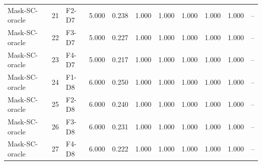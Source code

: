 \begin{table}[ht]
\begin{tabular}{lllrrrrrrrr}
Mask-SC-oracle & 21 & F2-D7 & 5.000 & 0.238 & 1.000 & 1.000 & 1.000 & 1.000 & 1.000 & -- \\
Mask-SC-oracle & 22 & F3-D7 & 5.000 & 0.227 & 1.000 & 1.000 & 1.000 & 1.000 & 1.000 & -- \\
Mask-SC-oracle & 23 & F4-D7 & 5.000 & 0.217 & 1.000 & 1.000 & 1.000 & 1.000 & 1.000 & -- \\
Mask-SC-oracle & 24 & F1-D8 & 6.000 & 0.250 & 1.000 & 1.000 & 1.000 & 1.000 & 1.000 & -- \\
Mask-SC-oracle & 25 & F2-D8 & 6.000 & 0.240 & 1.000 & 1.000 & 1.000 & 1.000 & 1.000 & -- \\
Mask-SC-oracle & 26 & F3-D8 & 6.000 & 0.231 & 1.000 & 1.000 & 1.000 & 1.000 & 1.000 & -- \\
Mask-SC-oracle & 27 & F4-D8 & 6.000 & 0.222 & 1.000 & 1.000 & 1.000 & 1.000 & 1.000 & -- \\
    \bottomrule
    \end{tabular}
\end{table}
